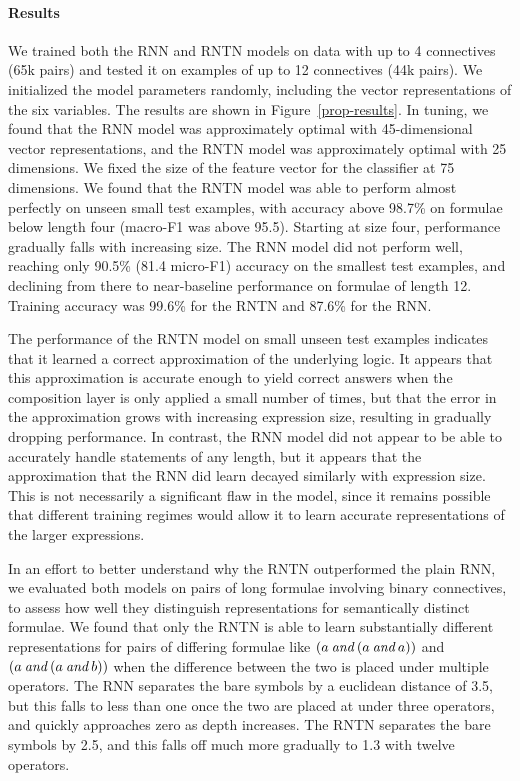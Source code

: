\paragraph{Results} 
We trained both the RNN and RNTN models on data with up to 4
connectives (65k pairs) and tested it on examples of up to 12
connectives (44k pairs). We initialized the model parameters randomly,
including the vector representations of the six variables. The results
are shown in Figure~\ref{prop-results}. In tuning, we found that the
RNN model was approximately optimal with 45-dimensional vector
representations, and the RNTN model was approximately optimal with 25
dimensions. We fixed the size of the feature vector for the classifier
at 75 dimensions. We found that the RNTN model was able to perform
almost perfectly on unseen small test examples, with accuracy above
98.7\% on formulae below length four (macro-F1 was above 95.5).
Starting at size four, performance gradually falls with increasing
size.  The RNN model did not perform well, reaching only 90.5\% (81.4
micro-F1) accuracy on the smallest test examples, and declining from
there to near-baseline performance on formulae of length 12. Training
accuracy was 99.6\% for the RNTN and 87.6\% for the RNN.


The performance of the RNTN model on small unseen test examples
indicates that it learned a correct approximation of the underlying
logic. It appears that this approximation is accurate enough to yield
correct answers when the composition layer is only applied a small
number of times, but that the error in the approximation grows with
increasing expression size, resulting in gradually dropping performance. In
contrast, the RNN model did not appear to be able to accurately handle statements of any length, but it
appears that the approximation that the RNN did learn decayed similarly
with expression size.  This is not necessarily a significant flaw in the model, since it remains possible that  different training regimes would allow it to learn accurate representations of the larger expressions. 

In an effort to better understand why the RNTN outperformed the plain
RNN, we evaluated both models on pairs of long formulae involving
binary connectives, to assess how well they distinguish representations for semantically distinct
formulae. We found that only the RNTN is able to learn
substantially different representations for pairs of differing formulae like $(a \mathbin{\textit{and}} (a \mathbin{\textit{and}} a))$
 and $(a \mathbin{\textit{and}} (a \mathbin{\textit{and}} b))$ when the difference between the two is placed under multiple operators.
The RNN separates the bare symbols by a euclidean distance of 3.5, but this falls to less than one once the two are placed at under three operators, and quickly approaches zero as depth increases.
 The RNTN separates the bare symbols by 2.5, and this falls off much more gradually to 1.3 with twelve operators.




